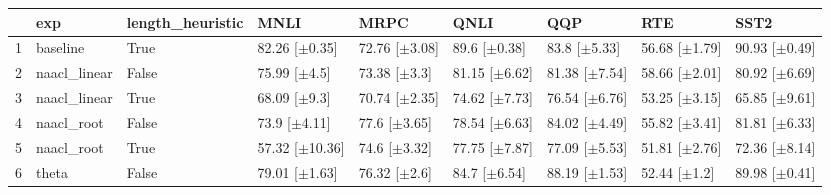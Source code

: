 \begin{table}[ht]
\centering
\begin{tabular}{rllllllll}
  \hline
 & exp & length_heuristic & MNLI & MRPC & QNLI & QQP & RTE & SST2 \\ 
  \hline
1 & baseline & True & 82.26 [$\pm$0.35] & 72.76 [$\pm$3.08] & 89.6 [$\pm$0.38] & 83.8 [$\pm$5.33] & 56.68 [$\pm$1.79] & 90.93 [$\pm$0.49] \\ 
  2 & naacl_linear & False & 75.99 [$\pm$4.5] & 73.38 [$\pm$3.3] & 81.15 [$\pm$6.62] & 81.38 [$\pm$7.54] & 58.66 [$\pm$2.01] & 80.92 [$\pm$6.69] \\ 
  3 & naacl_linear & True & 68.09 [$\pm$9.3] & 70.74 [$\pm$2.35] & 74.62 [$\pm$7.73] & 76.54 [$\pm$6.76] & 53.25 [$\pm$3.15] & 65.85 [$\pm$9.61] \\ 
  4 & naacl_root & False & 73.9 [$\pm$4.11] & 77.6 [$\pm$3.65] & 78.54 [$\pm$6.63] & 84.02 [$\pm$4.49] & 55.82 [$\pm$3.41] & 81.81 [$\pm$6.33] \\ 
  5 & naacl_root & True & 57.32 [$\pm$10.36] & 74.6 [$\pm$3.32] & 77.75 [$\pm$7.87] & 77.09 [$\pm$5.53] & 51.81 [$\pm$2.76] & 72.36 [$\pm$8.14] \\ 
  6 & theta & False & 79.01 [$\pm$1.63] & 76.32 [$\pm$2.6] & 84.7 [$\pm$6.54] & 88.19 [$\pm$1.53] & 52.44 [$\pm$1.2] & 89.98 [$\pm$0.41] \\ 
   \hline
\end{tabular}
\end{table}
